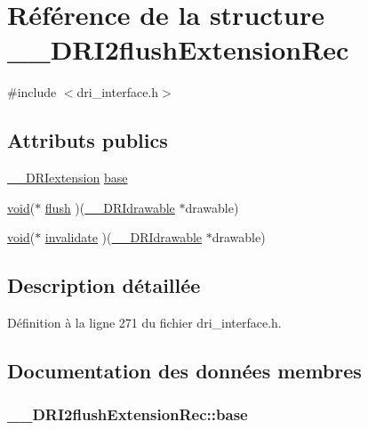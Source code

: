 \hypertarget{struct_____d_r_i2flush_extension_rec}{\section{Référence de la structure \-\_\-\-\_\-\-D\-R\-I2flush\-Extension\-Rec}
\label{struct_____d_r_i2flush_extension_rec}
}


{\ttfamily \#include $<$dri\-\_\-interface.\-h$>$}

\subsection*{Attributs publics}
\begin{DoxyCompactItemize}
\item 
\hyperlink{dri__interface_8h_a4e0a61c8ece00d2b2c6792a9a1b55385}{\-\_\-\-\_\-\-D\-R\-Iextension} \hyperlink{struct_____d_r_i2flush_extension_rec_a7edd276f3256a548ce5f71724345292d}{base}
\item 
\hyperlink{glu_8h_a4292190e3f1f6b373a760c7d9316ad3c}{void}($\ast$ \hyperlink{struct_____d_r_i2flush_extension_rec_a226b837f3645d46c2cb12ba080f98fca}{flush} )(\hyperlink{dri__interface_8h_a5bfb832a0a08208d95b3bbef439d2262}{\-\_\-\-\_\-\-D\-R\-Idrawable} $\ast$drawable)
\item 
\hyperlink{glu_8h_a4292190e3f1f6b373a760c7d9316ad3c}{void}($\ast$ \hyperlink{struct_____d_r_i2flush_extension_rec_a6585c319bc0cf13666d08f85c1d2e7c0}{invalidate} )(\hyperlink{dri__interface_8h_a5bfb832a0a08208d95b3bbef439d2262}{\-\_\-\-\_\-\-D\-R\-Idrawable} $\ast$drawable)
\end{DoxyCompactItemize}


\subsection{Description détaillée}


Définition à la ligne 271 du fichier dri\-\_\-interface.\-h.



\subsection{Documentation des données membres}
\hypertarget{struct_____d_r_i2flush_extension_rec_a7edd276f3256a548ce5f71724345292d}{
\subsubsection[{base}]{ \-\_\-\-\_\-\-D\-R\-I2flush\-Extension\-Rec\-::base}}\label{struct_____d_r_i2flush_extension_rec_a7edd276f3256a548ce5f71724345292d}


